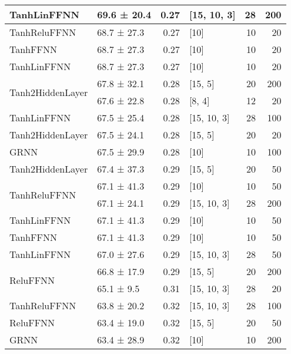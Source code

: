 \begin{longtable}{llrlrr}
 \hline
TanhLinFFNN         & 69.6 ± 20.4 &  0.27 & [15, 10, 3]    &         28 &      200 \\
 \hline
TanhReluFFNN         & 68.7 ± 27.3 &  0.27 & [10]           &         10 &       20 \\
 \hline
TanhFFNN         & 68.7 ± 27.3 &  0.27 & [10]           &         10 &       20 \\
 \hline
TanhLinFFNN         & 68.7 ± 27.3 &  0.27 & [10]           &         10 &       20 \\
 \hline
\multirow{2}{*}{Tanh2HiddenLayer}         & 67.8 ± 32.1 &  0.28 & [15, 5]        &         20 &      200 \\
         & 67.6 ± 22.8 &  0.28 & [8, 4]         &         12 &       20 \\
 \hline
TanhLinFFNN         & 67.5 ± 25.4 &  0.28 & [15, 10, 3]    &         28 &      100 \\
 \hline
Tanh2HiddenLayer         & 67.5 ± 24.1 &  0.28 & [15, 5]        &         20 &       20 \\
 \hline
GRNN         & 67.5 ± 29.9 &  0.28 & [10]           &         10 &      100 \\
 \hline
Tanh2HiddenLayer         & 67.4 ± 37.3 &  0.29 & [15, 5]        &         20 &       50 \\
 \hline
\multirow{2}{*}{TanhReluFFNN}         & 67.1 ± 41.3 &  0.29 & [10]           &         10 &       50 \\
         & 67.1 ± 24.1 &  0.29 & [15, 10, 3]    &         28 &      200 \\
 \hline
TanhLinFFNN         & 67.1 ± 41.3 &  0.29 & [10]           &         10 &       50 \\
 \hline
TanhFFNN         & 67.1 ± 41.3 &  0.29 & [10]           &         10 &       50 \\
 \hline
TanhLinFFNN         & 67.0 ± 27.6 &  0.29 & [15, 10, 3]    &         28 &       50 \\
 \hline
\multirow{2}{*}{ReluFFNN}         & 66.8 ± 17.9 &  0.29 & [15, 5]        &         20 &      200 \\
         & 65.1 ± 9.5  &  0.31 & [15, 10, 3]    &         28 &       20 \\
 \hline
TanhReluFFNN         & 63.8 ± 20.2 &  0.32 & [15, 10, 3]    &         28 &      100 \\
 \hline
ReluFFNN         & 63.4 ± 19.0 &  0.32 & [15, 5]        &         20 &       50 \\
 \hline
GRNN         & 63.4 ± 28.9 &  0.32 & [10]           &         10 &      200 \\

\end{longtable}
